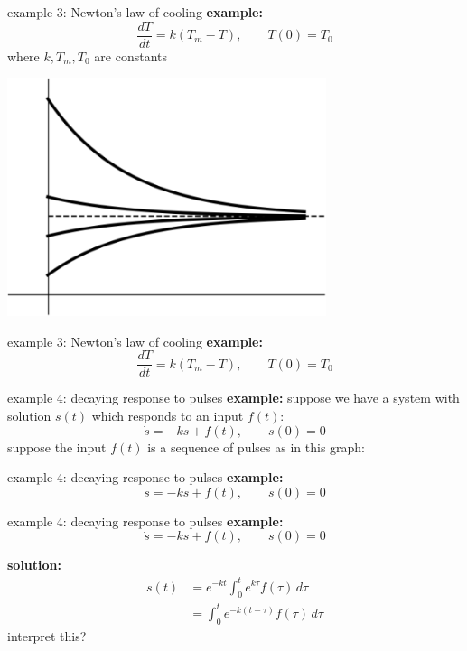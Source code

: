 \documentclass{beamer}
\begin{document}
\begin{frame}{example 3: Newton's law of cooling}
\textbf{example:}
        $$\frac{dT}{dt} = k (T_m - T), \qquad T(0)=T_0$$
    where $k,T_m,T_0$ are constants

\vspace{5mm}
\hfill \includegraphics[width=0.7\textwidth]{figs/coolingcurves.png}
\end{frame}


\begin{frame}{example 3: Newton's law of cooling}
\textbf{example:}
        $$\frac{dT}{dt} = k (T_m - T), \qquad T(0)=T_0$$

\vspace{70mm}
\end{frame}


\begin{frame}{example 4: decaying response to pulses}
\textbf{example:}  suppose we have a system with solution $s(t)$ which responds to an input $f(t)$:
        $$\dot s = -k s + f(t), \qquad s(0)=0$$
suppose the input $f(t)$ is a sequence of pulses as in this graph:

\vspace{50mm}
\end{frame}


\begin{frame}{example 4: decaying response to pulses}
\textbf{example:}
        $$\dot s = -k s + f(t), \qquad s(0)=0$$
    
\vspace{60mm}
\end{frame}


\begin{frame}{example 4: decaying response to pulses}
\textbf{example:}
        $$\dot s = -k s + f(t), \qquad s(0)=0$$
    
\textbf{solution:}
\begin{align*}
s(t) &= e^{-kt} \int_0^t e^{k\tau} f(\tau)\,d\tau \\
     &= \int_0^t e^{-k(t-\tau)} f(\tau)\,d\tau
\end{align*}
interpret this?

\vspace{30mm}
\end{frame}
\end{document}
